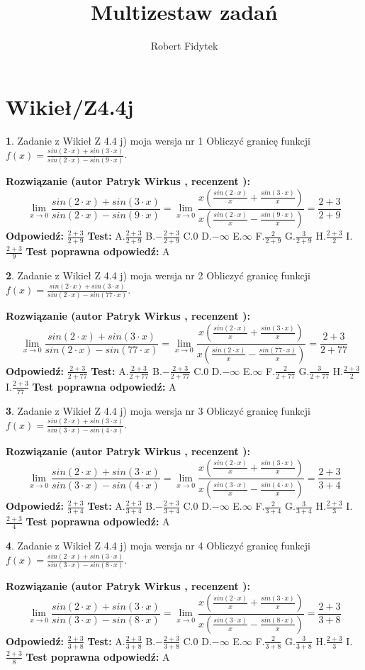 \documentclass[12pt, a4paper]{article}
\title{Multizestaw zadań}
\author{Robert Fidytek}
\date{}
\theoremstyle{definition} %
\newtheorem{zad}{}
\newcommand{\kategoria}[1]{\section{#1}}
\newcommand{\zadStart}[1]{\begin{zad}#1\newline}
\newcommand{\zadStop}{\end{zad}}
\newcommand{\rozwStart}[2]{\noindent \textbf{Rozwiązanie (autor #1 , recenzent #2): }\newline}
\newcommand{\rozwStop}{\newline}
\newcommand{\odpStart}{\noindent \textbf{Odpowiedź:}\newline}
\newcommand{\odpStop}{\newline}
\newcommand{\testStart}{\noindent \textbf{Test:}\newline}
\newcommand{\testStop}{\newline}
\newcommand{\kluczStart}{\noindent \textbf{Test poprawna odpowiedź:}\newline}
\newcommand{\kluczStop}{\newline}
\begin{document}
\maketitle

\kategoria{Wikieł/Z4.4j}


\zadStart{Zadanie z Wikieł Z 4.4 j) moja wersja nr 1}
Obliczyć granicę funkcji $f(x)=\frac{sin(2\cdot x) +sin(3\cdot x)}{sin(2\cdot x) -sin(9\cdot x)}$.
\zadStop
\rozwStart{Patryk Wirkus}{}
$$\lim\limits_{x\to 0}\frac{sin(2\cdot x) +sin(3\cdot x)}{sin(2\cdot x) -sin(9\cdot x)}=\lim\limits_{x\to 0}\frac{x(\frac{sin(2\cdot x)}{x}+\frac{sin(3\cdot x)}{x})}{x(\frac{sin(2\cdot x)}{x}-\frac{sin(9\cdot x)}{x})}=\frac{2+3}{2+9}$$
\rozwStop
\odpStart
$\frac{2+3}{2+9}$
\odpStop
\testStart
A.$\frac{2+3}{2+9}$
B.$-\frac{2+3}{2+9}$
C.$0$
D.$-\infty$
E.$\infty$
F.$\frac{2}{2+9}$
G.$\frac{3}{2+9}$
H.$\frac{2+3}{2}$
I.$\frac{2+3}{9}$
\testStop
\kluczStart
A
\kluczStop



\zadStart{Zadanie z Wikieł Z 4.4 j) moja wersja nr 2}
Obliczyć granicę funkcji $f(x)=\frac{sin(2\cdot x) +sin(3\cdot x)}{sin(2\cdot x) -sin(77\cdot x)}$.
\zadStop
\rozwStart{Patryk Wirkus}{}
$$\lim\limits_{x\to 0}\frac{sin(2\cdot x) +sin(3\cdot x)}{sin(2\cdot x) -sin(77\cdot x)}=\lim\limits_{x\to 0}\frac{x(\frac{sin(2\cdot x)}{x}+\frac{sin(3\cdot x)}{x})}{x(\frac{sin(2\cdot x)}{x}-\frac{sin(77\cdot x)}{x})}=\frac{2+3}{2+77}$$
\rozwStop
\odpStart
$\frac{2+3}{2+77}$
\odpStop
\testStart
A.$\frac{2+3}{2+77}$
B.$-\frac{2+3}{2+77}$
C.$0$
D.$-\infty$
E.$\infty$
F.$\frac{2}{2+77}$
G.$\frac{3}{2+77}$
H.$\frac{2+3}{2}$
I.$\frac{2+3}{77}$
\testStop
\kluczStart
A
\kluczStop



\zadStart{Zadanie z Wikieł Z 4.4 j) moja wersja nr 3}
Obliczyć granicę funkcji $f(x)=\frac{sin(2\cdot x) +sin(3\cdot x)}{sin(3\cdot x) -sin(4\cdot x)}$.
\zadStop
\rozwStart{Patryk Wirkus}{}
$$\lim\limits_{x\to 0}\frac{sin(2\cdot x) +sin(3\cdot x)}{sin(3\cdot x) -sin(4\cdot x)}=\lim\limits_{x\to 0}\frac{x(\frac{sin(2\cdot x)}{x}+\frac{sin(3\cdot x)}{x})}{x(\frac{sin(3\cdot x)}{x}-\frac{sin(4\cdot x)}{x})}=\frac{2+3}{3+4}$$
\rozwStop
\odpStart
$\frac{2+3}{3+4}$
\odpStop
\testStart
A.$\frac{2+3}{3+4}$
B.$-\frac{2+3}{3+4}$
C.$0$
D.$-\infty$
E.$\infty$
F.$\frac{2}{3+4}$
G.$\frac{3}{3+4}$
H.$\frac{2+3}{3}$
I.$\frac{2+3}{4}$
\testStop
\kluczStart
A
\kluczStop



\zadStart{Zadanie z Wikieł Z 4.4 j) moja wersja nr 4}
Obliczyć granicę funkcji $f(x)=\frac{sin(2\cdot x) +sin(3\cdot x)}{sin(3\cdot x) -sin(8\cdot x)}$.
\zadStop
\rozwStart{Patryk Wirkus}{}
$$\lim\limits_{x\to 0}\frac{sin(2\cdot x) +sin(3\cdot x)}{sin(3\cdot x) -sin(8\cdot x)}=\lim\limits_{x\to 0}\frac{x(\frac{sin(2\cdot x)}{x}+\frac{sin(3\cdot x)}{x})}{x(\frac{sin(3\cdot x)}{x}-\frac{sin(8\cdot x)}{x})}=\frac{2+3}{3+8}$$
\rozwStop
\odpStart
$\frac{2+3}{3+8}$
\odpStop
\testStart
A.$\frac{2+3}{3+8}$
B.$-\frac{2+3}{3+8}$
C.$0$
D.$-\infty$
E.$\infty$
F.$\frac{2}{3+8}$
G.$\frac{3}{3+8}$
H.$\frac{2+3}{3}$
I.$\frac{2+3}{8}$
\testStop
\kluczStart
A
\kluczStop
\end{document}

